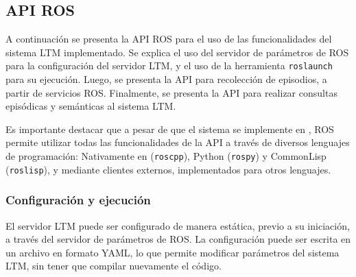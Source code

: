 \subsection{API ROS}

A continuación se presenta la API ROS para el uso de las funcionalidades del sistema LTM implementado. Se explica el uso del servidor de parámetros de ROS para la configuración del servidor LTM, y el uso de la herramienta \texttt{roslaunch} para su ejecución. Luego, se presenta la API para recolección de episodios, a partir de servicios ROS. Finalmente, se presenta la API para realizar consultas episódicas y semánticas al sistema LTM.

Es importante destacar que a pesar de que el sistema se implemente en \CC, ROS permite utilizar todas las funcionalidades de la API a través de diversos lenguajes de programación: Nativamente en \CC  (\texttt{roscpp}), Python (\texttt{rospy}) y CommonLisp (\texttt{roslisp}), y mediante clientes externos, implementados para otros lenguajes.


\subsubsection{Configuración y ejecución}

El servidor LTM puede ser configurado de manera estática, previo a su iniciación, a través del servidor de parámetros de ROS. La configuración puede ser escrita en un archivo en formato YAML, lo que permite modificar parámetros del sistema LTM, sin tener que compilar nuevamente el código. 

